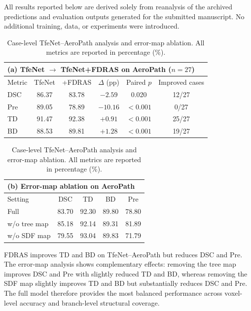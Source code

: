\documentclass[runningheads]{llncs}
\begin{document}
\noindent\footnotesize
All results reported below are derived solely from reanalysis of the archived
predictions and evaluation outputs generated for the submitted manuscript.
No additional training, data, or experiments were introduced.

\begin{table}[t]
\centering
\caption{Case-level TfeNet--AeroPath analysis and error-map ablation.
All metrics are reported in percentage (\%).}
\label{tab:supp_summary}
\footnotesize
\renewcommand{\arraystretch}{1.08}

\setlength{\tabcolsep}{7pt}
\begin{tabular}{lccccc}
\hline
\multicolumn{6}{l}{\textbf{(a) TfeNet $\rightarrow$ TfeNet+FDRAS on AeroPath ($n=27$)}} \\
\hline
Metric & TfeNet & +FDRAS & $\Delta$ (pp) & Paired $p$ & Improved cases \\
\hline
DSC & 86.37 & 83.78 & $-2.59$  & 0.020    & 12/27 \\
Pre & 89.05 & 78.89 & $-10.16$ & $<0.001$ & 0/27  \\
TD  & 91.47 & 92.38 & $+0.91$  & $<0.001$ & 25/27 \\
BD  & 88.53 & 89.81 & $+1.28$  & $<0.001$ & 19/27 \\
\hline
\end{tabular}

\vspace{2mm}

\setlength{\tabcolsep}{7pt}
\begin{tabular}{lcccc}
\hline
\multicolumn{5}{l}{\textbf{(b) Error-map ablation on AeroPath}} \\
\hline
Setting & DSC & TD & BD & Pre \\
\hline
Full         & 83.70 & 92.30 & 89.80 & 78.80 \\
w/o tree map & 85.18 & 92.14 & 89.31 & 81.89 \\
w/o SDF map  & 79.55 & 93.04 & 89.83 & 71.79 \\
\hline
\end{tabular}
\end{table}

\noindent\footnotesize
FDRAS improves TD and BD on TfeNet--AeroPath but reduces DSC and Pre.
The error-map analysis shows complementary effects: removing the tree map
improves DSC and Pre with slightly reduced TD and BD, whereas removing the
SDF map slightly improves TD and BD but substantially reduces DSC and Pre.
The full model therefore provides the most balanced performance across
voxel-level accuracy and branch-level structural coverage.
\end{document}
